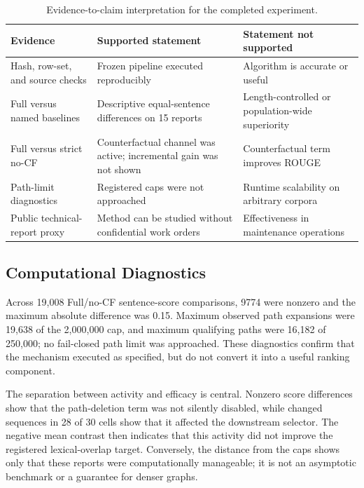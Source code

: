 \documentclass[applsci,article,submit,moreauthors]{Definitions/mdpi}
\begin{document}
\begin{table}[H]
\caption{Evidence-to-claim interpretation for the completed experiment.}
\label{tab:evidence-matrix}\centering\small
\begin{tabular}{p{}p{}p{}}
\toprule
Evidence & Supported statement & Statement not supported\\
\midrule
Hash, row-set, and source checks & Frozen pipeline executed reproducibly & Algorithm is accurate or useful\\
Full versus named baselines & Descriptive equal-sentence differences on 15 reports & Length-controlled or population-wide superiority\\
Full versus strict no-CF & Counterfactual channel was active; incremental gain was not shown & Counterfactual term improves ROUGE\\
Path-limit diagnostics & Registered caps were not approached & Runtime scalability on arbitrary corpora\\
Public technical-report proxy & Method can be studied without confidential work orders & Effectiveness in maintenance operations\\
\bottomrule
\end{tabular}
\end{table}

\subsection{Computational Diagnostics}

Across 19,008 Full/no-CF sentence-score comparisons, 9774 were nonzero and the maximum absolute difference was 0.15. Maximum observed path expansions were 19,638 of the 2,000,000 cap, and maximum qualifying paths were 16,182 of 250,000; no fail-closed path limit was approached. These diagnostics confirm that the mechanism executed as specified, but do not convert it into a useful ranking component.

The separation between activity and efficacy is central. Nonzero score differences show that the path-deletion term was not silently disabled, while changed sequences in 28 of 30 cells show that it affected the downstream selector. The negative mean contrast then indicates that this activity did not improve the registered lexical-overlap target. Conversely, the distance from the caps shows only that these reports were computationally manageable; it is not an asymptotic benchmark or a guarantee for denser graphs.
\end{document}

